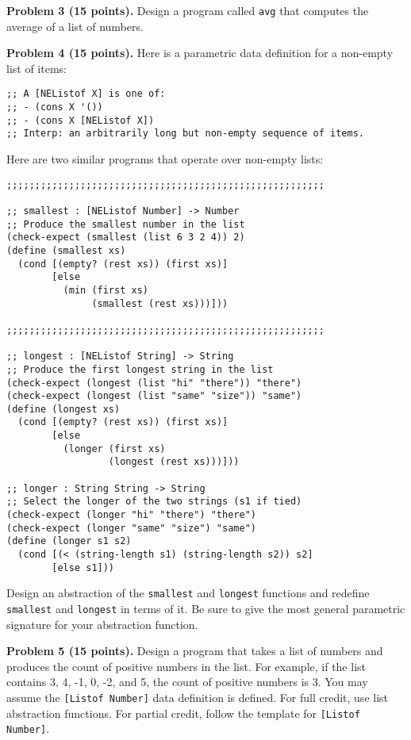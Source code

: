 \documentclass[12pt]{article}
\begin{document}
\newpage

\noindent
{\bf Problem 3 (15 points).}
%
Design a program called {\tt avg} that computes the average of a list of numbers.



\newpage 
\noindent
{\bf Problem 4 (15 points).}
%
Here is a parametric data definition for a non-empty list of items:
\begin{verbatim}
;; A [NEListof X] is one of:
;; - (cons X '())
;; - (cons X [NEListof X])
;; Interp: an arbitrarily long but non-empty sequence of items.
\end{verbatim}
Here are two similar programs that operate over non-empty lists:
\begin{verbatim}
;;;;;;;;;;;;;;;;;;;;;;;;;;;;;;;;;;;;;;;;;;;;;;;;;;;;;;;;

;; smallest : [NEListof Number] -> Number
;; Produce the smallest number in the list
(check-expect (smallest (list 6 3 2 4)) 2)
(define (smallest xs)
  (cond [(empty? (rest xs)) (first xs)]
        [else
          (min (first xs)
               (smallest (rest xs)))]))

;;;;;;;;;;;;;;;;;;;;;;;;;;;;;;;;;;;;;;;;;;;;;;;;;;;;;;;;

;; longest : [NEListof String] -> String
;; Produce the first longest string in the list
(check-expect (longest (list "hi" "there")) "there")
(check-expect (longest (list "same" "size")) "same")
(define (longest xs)
  (cond [(empty? (rest xs)) (first xs)]
        [else
          (longer (first xs)
                  (longest (rest xs)))]))

;; longer : String String -> String
;; Select the longer of the two strings (s1 if tied)
(check-expect (longer "hi" "there") "there")
(check-expect (longer "same" "size") "same")
(define (longer s1 s2)
  (cond [(< (string-length s1) (string-length s2)) s2]
        [else s1]))
\end{verbatim}

Design an abstraction of the {\tt smallest} and {\tt longest}
functions and redefine {\tt smallest} and {\tt longest} in terms of
it.  Be sure to give the most general parametric signature for your
abstraction function.


\newpage




\newpage
\noindent
{\bf Problem 5 (15 points).}  
%
Design a program that takes a list of numbers and produces the count
of positive numbers in the list.  For example, if the list contains 3,
4, -1, 0, -2, and 5, the count of positive numbers is 3.  You may
assume the {\tt{[Listof Number]}} data definition is defined.
%
For full credit, use list abstraction functions.  For partial credit,
follow the template for {\tt{[Listof Number]}}.
\end{document}

